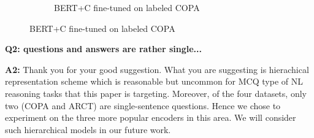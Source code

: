\documentclass[letterpaper]{article}
\newcommand{\figref}[1]{Figure \ref{#1}}
\begin{document}
\begin{figure}[th]
\begin{subfigure}[b]{0.20\textwidth}
\caption{BERT+C fine-tuned on labeled COPA}
\label{fig:cross_mlm}
\end{subfigure}
\end{figure}



\noindent
\textbf{Q2: questions and answers are rather single...}

\noindent
\textbf{A2:} Thank you for your good suggestion. What you are 
suggesting is hierachical representation scheme which is reasonable but 
uncommon for MCQ type of NL reasoning tasks that this paper is targeting. 
Moreover, of the four datasets, only two (COPA and ARCT) are single-sentence questions. 
Hence we chose to experiment on the three more popular encoders in this area.
We will consider such hierarchical models in our future work.
\end{document}
